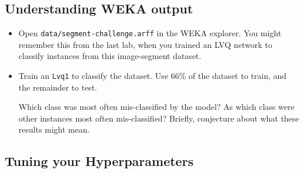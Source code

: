 \documentclass[11pt]{cselabheader}
\begin{document}
\subsection{Understanding WEKA output}

\begin{itemize}[leftmargin=*]
  \item Open \texttt{data/segment-challenge.arff} in the WEKA explorer. You might remember this from the last lab, when you trained an LVQ network to classify instances from this image-segment dataset.

  \item Train an \texttt{Lvq1} to classify the dataset. Use 66\% of the dataset to train, and the remainder to test.

  \begin{ex}
    Which class was most often mis-classified by the model? As which class were other instances most often mis-classified? Briefly, conjecture about what these results might mean.
  \end{ex}
\end{itemize}

\subsection{Tuning your Hyperparameters}
\end{document}
